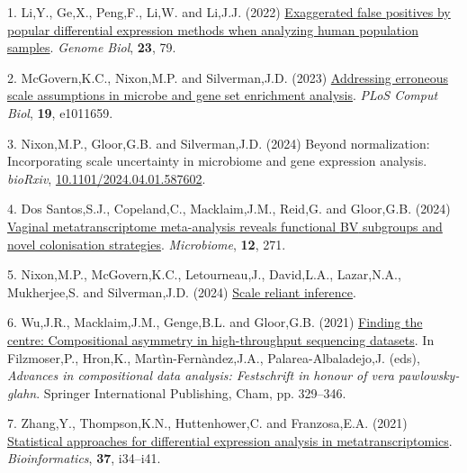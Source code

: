 \documentclass[
]{article}
\newlength{\cslhangindent}
\newenvironment{CSLReferences}[2] %
 {\begin{list}{}{%
  \setlength{\itemindent}{0pt}
  \setlength{\leftmargin}{0pt}
  \setlength{\parsep}{0pt}
  \ifodd #1
   \setlength{\leftmargin}{\cslhangindent}
   \setlength{\itemindent}{-1\cslhangindent}
  \fi
  \setlength{\itemsep}{#2\baselineskip}}}
 {\end{list}}
\begin{document}
\label{refs}
\begin{CSLReferences}{1}{1}
1. Li,Y., Ge,X., Peng,F., Li,W. and Li,J.J. (2022)
\href{https://doi.org/10.1186/s13059-022-02648-4}{Exaggerated false
positives by popular differential expression methods when analyzing
human population samples}. \emph{Genome Biol}, \textbf{23}, 79.

2. McGovern,K.C., Nixon,M.P. and Silverman,J.D. (2023)
\href{https://doi.org/10.1371/journal.pcbi.1011659}{Addressing erroneous
scale assumptions in microbe and gene set enrichment analysis}.
\emph{PLoS Comput Biol}, \textbf{19}, e1011659.

3. Nixon,M.P., Gloor,G.B. and Silverman,J.D. (2024) Beyond
normalization: Incorporating scale uncertainty in microbiome and gene
expression analysis. \emph{bioRxiv},
\href{https://doi.org/10.1101/2024.04.01.587602}{10.1101/2024.04.01.587602}.

4. Dos Santos,S.J., Copeland,C., Macklaim,J.M., Reid,G. and Gloor,G.B.
(2024) \href{https://doi.org/10.1186/s40168-024-01992-w}{Vaginal
metatranscriptome meta-analysis reveals functional {BV} subgroups and
novel colonisation strategies}. \emph{Microbiome}, \textbf{12}, 271.

5. Nixon,M.P., McGovern,K.C., Letourneau,J., David,L.A., Lazar,N.A.,
Mukherjee,S. and Silverman,J.D. (2024)
\href{https://arxiv.org/abs/2201.03616}{Scale reliant inference}.

6. Wu,J.R., Macklaim,J.M., Genge,B.L. and Gloor,G.B. (2021)
\href{https://doi.org/10.1007/978-3-030-71175-7_17}{Finding the centre:
Compositional asymmetry in high-throughput sequencing datasets}. In
Filzmoser,P., Hron,K., Martìn-Fernàndez,J.A., Palarea-Albaladejo,J.
(eds), \emph{Advances in compositional data analysis: Festschrift in
honour of vera pawlowsky-glahn}. Springer International Publishing,
Cham, pp. 329--346.

7. Zhang,Y., Thompson,K.N., Huttenhower,C. and Franzosa,E.A. (2021)
\href{https://doi.org/10.1093/bioinformatics/btab327}{Statistical
approaches for differential expression analysis in metatranscriptomics}.
\emph{Bioinformatics}, \textbf{37}, i34--i41.

\end{CSLReferences}
\end{document}
